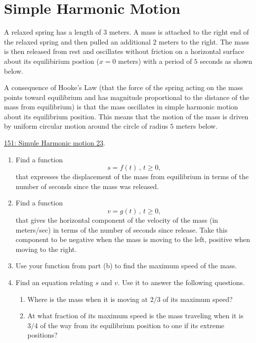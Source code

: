 \documentclass{ximera}
\begin{document}
\section{Simple Harmonic Motion}

\begin{question} \label{QODFIER33r3r}
A relaxed spring has a length of $3$ meters. A mass is attached to the right end of the relaxed spring and then pulled an additional $2$ meters to the right. The mass is then released from rest and oscillates without friction on a horizontal surface about its equilibirium postion ($x=0$ meters) with a period of $5$ seconds as shown below. 

A consequence of Hooke's Law (that the force of the spring acting on the mass points toward equilibrium and has magnitude proportional to the distance of the mass from equilibrium) is that the mass oscillates in simple harmonic motion about its equilibrium position.  This means that the motion of the mass is driven by uniform circular motion around the circle of radius $5$ meters below.

\href{https://www.desmos.com/calculator/noxooak1au}{151: Simple Harmonic motion 23}.

 
\begin{onlineOnly}
    \begin{center}
\end{center}
\end{onlineOnly}


\begin{enumerate}

\item Find a function
\[
     s = f(t) \, , \, t\geq 0, 
\]
that expresses the displacement of the mass from equilibrium in terms of the number of seconds since the mass was released.

\item Find a function 
\[
 v = g(t) \, , \, t\geq 0, 
\]
that gives the horizontal component of the velocity of the mass (in meters/sec) in terms of the number of seconds since release. Take this component to be negative when the mass is moving to the left, positive when moving to the right.

\item Use your function from part (b) to find the maximum speed of the mass.

\item Find an equation relating $s$ and $v$. Use it to answer the following questions.

\begin{enumerate}
\item Where is the mass when it is moving at $2/3$ of its maximum speed? 

\item At what fraction of its maximum speed is the mass traveling when it is $3/4$ of the way from its equilibrium position to one if its extreme positions?
\end{enumerate}

\end{enumerate}

\end{question}
\end{document}
